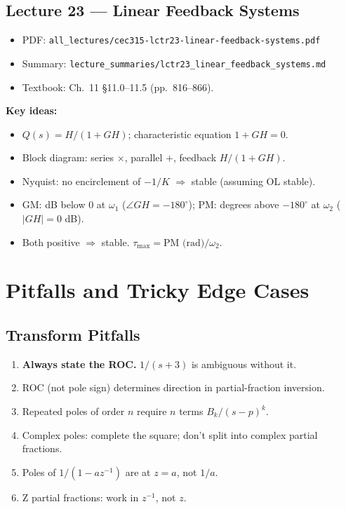 \documentclass[11pt]{article}
\begin{document}
\subsection{Lecture 23 --- Linear Feedback Systems}
\begin{itemize}[leftmargin=*]
  \item PDF: \texttt{all\_lectures/cec315-lctr23-linear-feedback-systems.pdf}
  \item Summary: \texttt{lecture\_summaries/lctr23\_linear\_feedback\_systems.md}
  \item Textbook: Ch.~11 \S 11.0--11.5 (pp.~816--866).
\end{itemize}
\textbf{Key ideas:}
\begin{itemize}[leftmargin=*]
  \item $Q(s) = H/(1+GH)$; characteristic equation $1+GH = 0$.
  \item Block diagram: series $\times$, parallel $+$, feedback $H/(1+GH)$.
  \item Nyquist: no encirclement of $-1/K$ $\Rightarrow$ stable (assuming OL stable).
  \item GM: dB below 0 at $\omega_1$ ($\angle GH = -180^\circ$); PM: degrees above $-180^\circ$ at $\omega_2$ ($|GH|=0$ dB).
  \item Both positive $\Rightarrow$ stable. $\tau_{\max} = \text{PM (rad)}/\omega_2$.
\end{itemize}

\section{Pitfalls and Tricky Edge Cases}

\subsection{Transform Pitfalls}
\begin{enumerate}[leftmargin=*]
  \item \textbf{Always state the ROC.} $1/(s+3)$ is ambiguous without it.
  \item ROC (not pole sign) determines direction in partial-fraction inversion.
  \item Repeated poles of order $n$ require $n$ terms $B_k/(s-p)^k$.
  \item Complex poles: complete the square; don't split into complex partial fractions.
  \item Poles of $1/(1-az^{-1})$ are at $z=a$, not $1/a$.
  \item Z partial fractions: work in $z^{-1}$, not $z$.
\end{enumerate}
\end{document}
